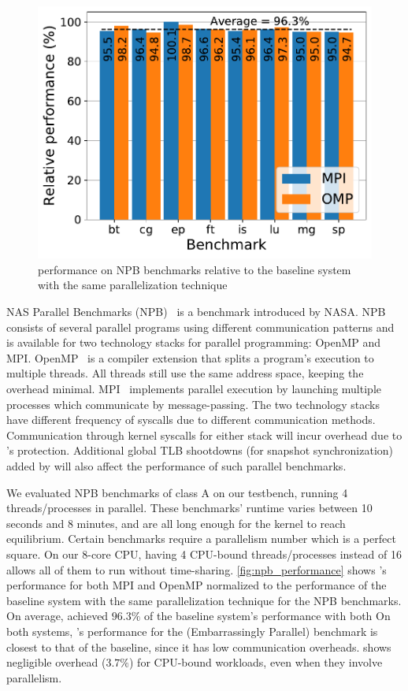 \documentclass[letterpaper,twocolumn,10pt, anonymous]{article}
\begin{document}
\begin{figure}[]
  \includegraphics[width=\linewidth]{img/npb_performance.pdf}
  \caption{\tiktok performance on NPB benchmarks relative to the baseline 
          system with the same parallelization technique}
  \label{fig:npb_performance}
\end{figure}

NAS Parallel Benchmarks (NPB)~\cite{npb} is a benchmark introduced by
NASA. 
NPB consists of several parallel programs using different communication
patterns and is available for two technology stacks for parallel programming:
OpenMP and MPI.
OpenMP~\cite{dagum1998openmp} is a compiler extension that splits a 
program's execution to multiple threads. 
All threads still use the same address space, keeping the overhead minimal. 
MPI~\cite{snir1998mpi} implements parallel execution by launching multiple
processes which communicate by message-passing. 
The two technology stacks have different frequency of syscalls due to 
different communication methods.
Communication through kernel syscalls for either stack will incur overhead
due to \tiktok's protection.
Additional global TLB shootdowns (for snapshot synchronization) added by \tiktok will also affect the 
performance of such parallel benchmarks.

We evaluated NPB benchmarks of class A on our testbench, running 
4 threads/processes in parallel.
These benchmarks' runtime varies between 10 seconds and 8 minutes, 
and are all long enough for the kernel to reach equilibrium.
Certain benchmarks require a parallelism number which is a perfect square.
On our 8-core CPU, having 4 CPU-bound threads/processes instead of 16 allows 
all of them to run without time-sharing.
\autoref{fig:npb_performance} shows \tiktok's performance for both MPI and OpenMP 
normalized to the performance of the baseline system with the same parallelization
technique for the NPB benchmarks.
On average, \tiktok achieved $96.3\%$ of the baseline system's performance with 
both 
On both systems, \tiktok's performance for the  (Embarrassingly Parallel)
benchmark is closest to that of the baseline, since it has low 
communication overheads.
\tiktok shows negligible overhead ($3.7\%$) for CPU-bound workloads, even when they 
involve parallelism.
\end{document}
